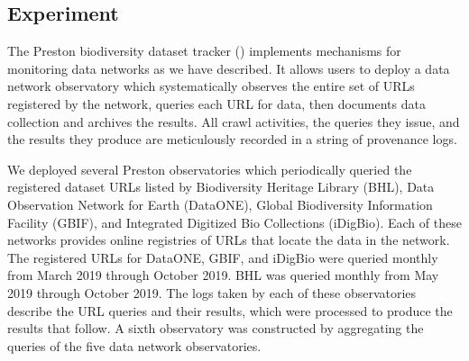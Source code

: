 \documentclass[10pt,letterpaper]{article}
\begin{document}
\subsection*{Experiment}

The Preston biodiversity dataset tracker (\cite{jorrit_poelen_2018_1410543}) implements mechanisms for monitoring data networks as we have described. It allows users to deploy a data network observatory which systematically observes the entire set of URLs registered by the network, queries each URL for data, then documents data collection and archives the results. All crawl activities, the queries they issue, and the results they produce are meticulously recorded in a string of provenance logs.

We deployed several Preston observatories which periodically queried the registered dataset URLs listed by Biodiversity Heritage Library (BHL), Data Observation Network for Earth (DataONE), Global Biodiversity Information Facility (GBIF), and Integrated Digitized Bio Collections (iDigBio). Each of these networks provides online registries of URLs that locate the data in the network. The registered URLs for DataONE, GBIF, and iDigBio were queried monthly from March 2019 through October 2019. BHL was queried monthly from May 2019 through October 2019. The logs taken by each of these observatories describe the URL queries and their results, which were processed to produce the results that follow. A sixth observatory was constructed by aggregating the queries of the five data network observatories.
\end{document}
